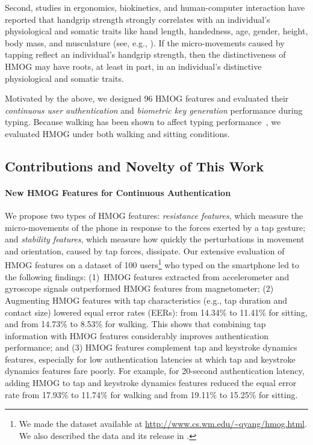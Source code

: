 
Second, studies in ergonomics, biokinetics, and human-computer interaction have reported that handgrip strength strongly correlates with an individual's physiological and somatic traits like hand length, handedness, age, gender, height, body mass, and musculature (see, e.g.,  \cite{fiebert1998relationship,chatterjee1991comparison,kim2006hand}). If the micro-movements caused by tapping reflect an individual's handgrip strength, then the distinctiveness of HMOG may have roots, at least in part, in an individual's distinctive physiological and somatic traits.

Motivated by the above, we designed 96 HMOG features and evaluated their {\em continuous user authentication} and {\em biometric key generation} performance during typing. Because walking has been shown to affect typing performance~\cite{MizobuchiCN05}, we evaluated HMOG under both walking and sitting conditions. 




%

%

%
%

%
%
%
%
%
%
%
%
%
%
%
%
%
%
%
%
\subsection{Contributions and Novelty of This Work}
%

\paragraph{New HMOG Features for Continuous Authentication} 
We propose two types of HMOG features: {\em resistance features}, which measure the micro-movements of the phone in response to the forces exerted by a tap gesture; and {\em stability features}, which measure how quickly the perturbations in movement and orientation, caused by tap forces, dissipate. %
Our extensive evaluation of HMOG features on a dataset  of 100 users\footnote{We made the dataset available at \url{http://www.cs.wm.edu/~qyang/hmog.html}. We also described the data and its release in \cite{qingPoster}.} who typed on the smartphone led to the following findings: (1)~HMOG features extracted from accelerometer and gyroscope signals outperformed HMOG features from magnetometer;
%
(2) Augmenting HMOG features with tap characteristics (e.g., tap duration and contact size) lowered equal error rates (EERs): from 14.34\% to 11.41\% for sitting, and from 14.73\% to 8.53\% for walking.
This shows that combining tap information with HMOG features considerably improves authentication performance; and (3) HMOG features complement tap and keystroke dynamics features, especially for low authentication latencies at which tap and keystroke dynamics features fare poorly. For example, for 20-second authentication latency, adding HMOG to tap and keystroke dynamics features reduced the equal error rate from 17.93\% to 11.74\% for walking and from 19.11\% to 15.25\% for sitting.
%

